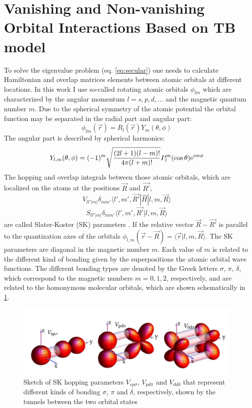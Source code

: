 \section{Vanishing and Non-vanishing Orbital Interactions Based on TB model}
To solve the eigenvalue problem (eq. \ref{eq:secular}) one needs to calculate Hamiltonian and overlap matrices elements between atomic orbitals at different locations. In this work I use so-called rotating atomic orbitals $\phi_{lm}$ which are characterized by the angular momentum $l = {s, p, d, ...}$ and the magnetic quantum number $m$. Due to the spherical symmetry of the atomic potential the orbital function may be separated in the radial part and angular part:
\begin{equation}
	\phi_{lm}(\vec{r}) = R_l(\vec{r}) Y_m(\theta, \phi)
\end{equation}
The angular part is described by spherical harmonics:
\begin{equation}
	Y_{l,m}(\theta, \phi) = (-1)^m \sqrt{\frac{(2l + 1)(l-m)!}{4 \pi (l+m)!}} P_l^m(\cos{\theta})\mathrm{e}^{i m \phi}
\end{equation}
The hopping and overlap integrals between those atomic orbitals, which are localized on the atoms at the positions $\vec{R}$ and $\vec{R'}$,
\begin{equation}
	V_{ll'|m|} \delta_{mm'}\langle l', m', \vec{R'} | \hat{H} | l, m , \vec{R} \rangle
\end{equation}
\begin{equation}
	S_{ll'|m|} \delta_{mm'}\langle l', m', \vec{R'} | l, m , \vec{R} \rangle
\end{equation}
are called Slater-Koster (SK) parameters \cite{slatter}. If the relative vector $\vec{R}-\vec{R'}$ is parallel to the quantization axes of the orbitals $\phi_{l,m}(\vec{r} - \vec{R}) = \langle \vec{r} | l, m, \vec{R} \rangle$. The SK parameters are diagonal in the magnetic number $m$. Each value of $m$ is related to the different kind of bonding given by the superpositions the atomic orbital wave functions. The different bonding types are denoted by the Greek letters $\sigma$, $\pi$, $\delta$, which correspond to the magnetic numbers $m = {0, 1, 2}$, respectively, and are related to the homonymous molecular orbitals, which are shown schematically in \ref{fig:orbitals}. 
\begin{figure}[hb]
  \includegraphics[width=\linewidth]{img/orbitals}
  \caption[caption]{Sketch of SK hopping parameters $V_{sp\sigma}$, $V_{pd\pi}$ and $V_{dd\delta}$ that represent different kinds of bonding $\sigma$, $\pi$ and $\delta$, respectively, shown by the tunnels between the two orbital states\footnotemark \label{fig:orbitals}}
\end{figure}

